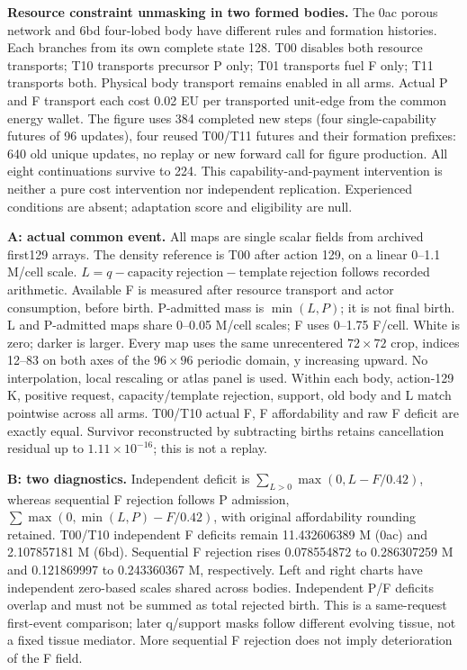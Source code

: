 \textbf{Resource constraint unmasking in two formed bodies.}
The 0ac porous network and 6bd four-lobed body have different rules and formation histories. Each branches from its own complete state 128. T00 disables both resource transports; T10 transports precursor P only; T01 transports fuel F only; T11 transports both. Physical body transport remains enabled in all arms. Actual P and F transport each cost 0.02 EU per transported unit-edge from the common energy wallet. The figure uses 384 completed new steps (four single-capability futures of 96 updates), four reused T00/T11 futures and their formation prefixes: 640 old unique updates, no replay or new forward call for figure production. All eight continuations survive to 224. This capability-and-payment intervention is neither a pure cost intervention nor independent replication. Experienced conditions are absent; adaptation score and eligibility are null.

\textbf{A: actual common event.} All maps are single scalar fields from archived first129 arrays. The density reference is T00 after action 129, on a linear 0--1.1 M/cell scale. $L=q-\mathrm{capacity\ rejection}-\mathrm{template\ rejection}$ follows recorded arithmetic. Available F is measured after resource transport and actor consumption, before birth. P-admitted mass is $\min(L,P)$; it is not final birth. L and P-admitted maps share 0--0.05 M/cell scales; F uses 0--1.75 F/cell. White is zero; darker is larger. Every map uses the same unrecentered $72\times72$ crop, indices 12--83 on both axes of the $96\times96$ periodic domain, y increasing upward. No interpolation, local rescaling or atlas panel is used. Within each body, action-129 K, positive request, capacity/template rejection, support, old body and L match pointwise across all arms. T00/T10 actual F, F affordability and raw F deficit are exactly equal. Survivor reconstructed by subtracting births retains cancellation residual up to $1.11\times10^{-16}$; this is not a replay.

\textbf{B: two diagnostics.} Independent deficit is $\sum_{L>0}\max(0,L-F/0.42)$, whereas sequential F rejection follows P admission, $\sum\max(0,\min(L,P)-F/0.42)$, with original affordability rounding retained. T00/T10 independent F deficits remain 11.432606389 M (0ac) and 2.107857181 M (6bd). Sequential F rejection rises 0.078554872 to 0.286307259 M and 0.121869997 to 0.243360367 M, respectively. Left and right charts have independent zero-based scales shared across bodies. Independent P/F deficits overlap and must not be summed as total rejected birth. This is a same-request first-event comparison; later q/support masks follow different evolving tissue, not a fixed tissue mediator. More sequential F rejection does not imply deterioration of the F field.

